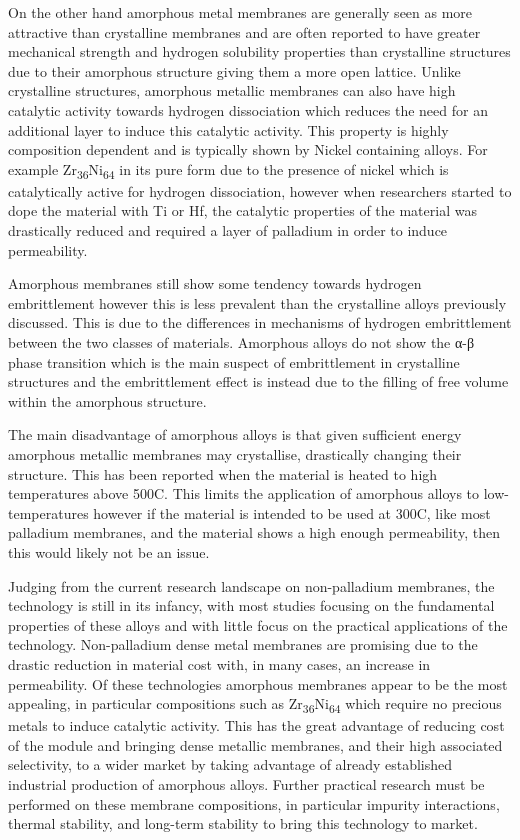 On the other hand amorphous metal membranes are generally seen as more attractive than crystalline membranes and are often reported to have greater mechanical strength and hydrogen solubility properties than crystalline structures due to their amorphous structure giving them a more open lattice. Unlike crystalline structures, amorphous metallic membranes can also have high catalytic activity towards hydrogen dissociation which reduces the need for an additional layer to induce this catalytic activity. This property is highly composition dependent and is typically shown by Nickel containing alloys. \cite{Hara2000} For example Zr\textsubscript{36}Ni\textsubscript{64} in its pure form due to the presence of nickel which is catalytically active for hydrogen dissociation, however when researchers started to dope the material with Ti or Hf, the catalytic properties of the material was drastically reduced and required a layer of palladium in order to induce permeability.  

Amorphous membranes still show some tendency towards hydrogen embrittlement however this is less prevalent than the crystalline alloys previously discussed. This is due to the differences in mechanisms of hydrogen embrittlement between the two classes of materials. Amorphous alloys do not show the α-β phase transition which is the main suspect of embrittlement in crystalline structures \cite{Hara2000} and the embrittlement effect is instead due to the filling of free volume within the amorphous structure. 

The main disadvantage of amorphous alloys is that given sufficient energy amorphous metallic membranes may crystallise, drastically changing their structure. This has been reported when the material is heated to high temperatures above 500\textdegree C. \cite{Hara2000} This limits the application of amorphous alloys to low-temperatures however if the material is intended to be used at 300\textdegree C, like most palladium membranes, and the material shows a high enough permeability, then this would likely not be an issue. 

Judging from the current research landscape on non-palladium membranes, the technology is still in its infancy, with most studies focusing on the fundamental properties of these alloys and with little focus on the practical applications of the technology.  Non-palladium dense metal membranes are promising due to the drastic reduction in material cost with, in many cases, an increase in permeability. Of these technologies amorphous membranes appear to be the most appealing, in particular compositions such as Zr\textsubscript{36}Ni\textsubscript{64} which require no precious metals to induce catalytic activity. This has the great advantage of reducing cost of the module and bringing dense metallic membranes, and their high associated selectivity, to a wider market by taking advantage of already established industrial production of amorphous alloys. Further practical research must be performed on these membrane compositions, in particular impurity interactions, thermal stability, and long-term stability to bring this technology to market.  

